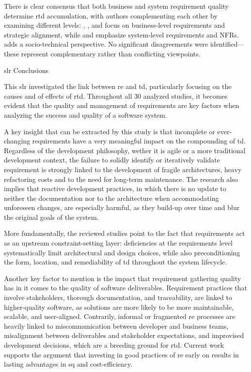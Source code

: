 \documentclass[12pt,reqno, twoside]{amsbook}
\makeatletter
\def\subsection{\@startsection{subsection}{2}%
      \z@{.5\linespacing\@plus.7\linespacing}{.25\linespacing}%
      {\normalfont\bfseries\flushleft}}
\theoremstyle{plain}
\numberwithin{equation}{chapter}
\numberwithin{section}{chapter}
\makeatother
\begin{document}
There is clear consensus that both business and system requirement quality determine \gls{rtd} accumulation, with authors complementing each other by examining different levels: \textcite{Rios2019}, \textcite{Besker2019}, and \textcite{Freire2020} focus on business-level requirements and strategic alignment, while \textcite{Melo2022} and \textcite{Rios2019} emphasize system-level requirements and NFRs. \textcite{Klotins2018} adds a socio-technical perspective. No significant disagreements were identified—these represent complementary rather than conflicting viewpoints.

\subsection{\gls{slr} Conclusions}

This \gls{slr} investigated the link between \gls{re} and \gls{td}, particularly focusing on the causes and of effects of \gls{rtd}. Throughout all 30 analyzed studies, it becomes evident that the quality and management of requirements are key factors when analyzing the success and quality of a  software system.

A key insight that can be extracted by this study is that incomplete or ever-changing requirements have a very meaningful impact on the compounding of \gls{td}. Regardless of the development philosophy, wether it is agile or a more traditional development context, the failure to solidly identify or iteratively validate requirement is strongly linked to the development of fragile architectures, heavy refactoring costs and to the need for long-term maintenance. The research also implies that reactive development practices, in which there is no update to neither the documentation nor to the architecture when accommodating unforeseen changes, are especially harmful, as they build-up over time and blur the original goals of the system.

More fundamentally, the reviewed studies point to the fact that requirements act as an upstream constraint-setting layer: deficiencies at the requirements level systematically 
limit architectural and design choices, while also preconditioning the form, location, and remediability of \gls{td} throughout the system lifecycle.

Another key factor to mention is the impact that requirement gathering quality has in it comes to the quality of software deliverables. Requirement practices  that involve stakeholders, thorough documentation, and traceability, are linked to higher-quality software, as solutions are more likely to be more maintainable, scalable, and user-aligned. Contrarily, informal or fragmented \gls{re} processes are heavily linked to miscommunication between developer and business teams, misalignment between deliverables and stakeholder expectations, and improvised development decisions, which are a breeding ground for \gls{rtd}. Current work supports the argument that investing in good practices of \gls{re} early on results in lasting advantages in \gls{sq} and cost-efficiency.
\end{document}
